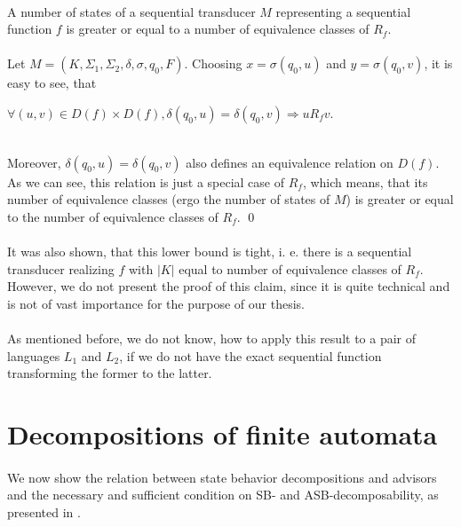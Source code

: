 \paragraph{}
\cveta A number of states of a sequential transducer $M$ representing a sequential function $f$ is greater or equal to a number of equivalence classes of $R_{f}$.

\paragraph{}
\dokaz Let $M=(K, \Sigma_{1}, \Sigma_{2}, \delta, \sigma, q_{0}, F)$. Choosing $x = \sigma (q_{0}, u)$ and $y = \sigma (q_{0}, v)$, it is easy to see, that\\
\centerline{$\forall (u,v) \in D(f) \times D(f), \delta (q_{0}, u) = \delta (q_{0}, v) \Rightarrow u R_{f} v$.}\\
Moreover, $\delta (q_{0}, u) = \delta (q_{0}, v)$ also defines an equivalence relation on $D(f)$. As we can see, this relation is just a special case of $R_{f}$, which means, that its number of equivalence classes (ergo the number of states of $M$) is greater or equal to the number of equivalence classes of $R_{f}$. \qed

\paragraph{}
It was also shown, that this lower bound is tight, i. e. there is a sequential transducer realizing $f$ with $|K|$ equal to number of equivalence classes of $R_{f}$. However, we do not present the proof of this claim, since it is quite technical and is not of vast importance for the purpose of our thesis.

\paragraph{}
As mentioned before, we do not know, how to apply this result to a pair of languages $L_{1}$ and $L_{2}$, if we do not have the exact sequential function transforming the former to the latter.

\section{Decompositions of finite automata}

\paragraph{}
We now show the relation between state behavior decompositions and advisors and the necessary and sufficient condition on SB- and ASB-decomposability, as presented in \cite{Gazi}.

